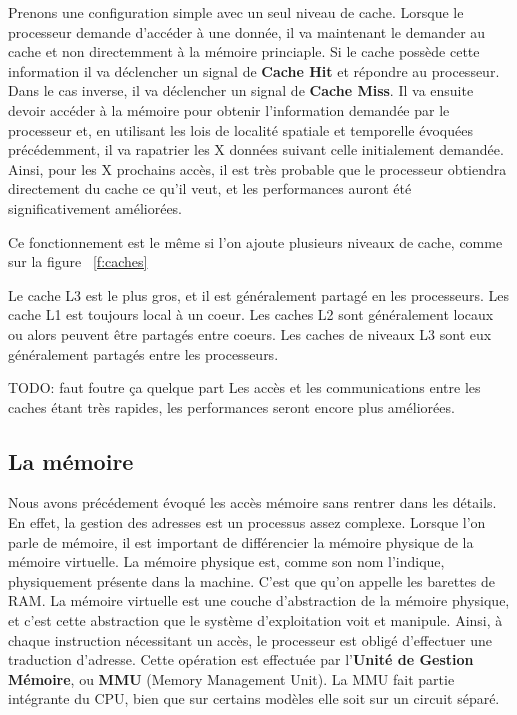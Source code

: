       Prenons une configuration simple avec un seul niveau de cache. Lorsque le
      processeur demande d'accéder à une donnée, il va maintenant le demander au
      cache et non directemment à la mémoire princiaple. Si le cache possède
      cette information il va déclencher un signal de \textbf{Cache Hit} et
      répondre au processeur. Dans le cas inverse, il va déclencher un signal de
      \textbf{Cache Miss}. Il va ensuite devoir accéder à la mémoire pour
      obtenir l'information demandée par le processeur et, en utilisant les lois
      de localité spatiale et temporelle évoquées précédemment, il va rapatrier
      les X données suivant celle initialement demandée. Ainsi, pour les X
      prochains accès, il est très probable que le processeur obtiendra
      directement du cache ce qu'il veut, et les performances auront été
      significativement améliorées.

      Ce fonctionnement est le même si l'on ajoute plusieurs niveaux de cache,
      comme sur la figure ~\ref{f:caches}


      Le cache L3 est le plus gros, et il est généralement partagé en les
      processeurs. Les cache L1 est toujours local à un coeur. Les caches L2
      sont généralement locaux ou alors peuvent être partagés entre coeurs. Les
      caches de niveaux L3 sont eux généralement partagés entre les processeurs.

      TODO: faut foutre ça quelque part\newline
      Les accès et les communications entre les caches étant très rapides, les
      performances seront encore plus améliorées.

    \subsection{La mémoire}

    Nous avons précédement évoqué les accès mémoire sans rentrer dans les
    détails. En effet, la gestion des adresses est un processus assez
    complexe. Lorsque l'on parle de mémoire, il est important de différencier la
    mémoire physique de la mémoire virtuelle. La mémoire physique est, comme son
    nom l'indique, physiquement présente dans la machine. C'est que qu'on appelle
    les \og barettes de RAM\fg. La mémoire virtuelle est une couche
    d'abstraction de la mémoire physique, et c'est cette abstraction que le
    système d'exploitation voit et manipule. Ainsi, à chaque instruction
    nécessitant un accès, le processeur est obligé d'effectuer une traduction
    d'adresse. Cette opération est effectuée par l'\textbf{Unité de Gestion
      Mémoire}, ou \textbf{MMU} (Memory Management Unit). La MMU fait partie
      intégrante du CPU, bien que sur certains modèles elle soit sur un circuit
      séparé.\newline

